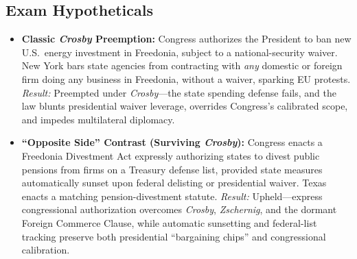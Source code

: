 \documentclass[12pt]{article}
\begin{document}
\subsection{Exam Hypotheticals}
\begin{itemize}
    \item \textbf{Classic \textit{Crosby} Preemption:} Congress authorizes the President to ban new U.S.\ energy investment in Freedonia, subject to a national-security waiver. New York bars state agencies from contracting with \textit{any} domestic or foreign firm doing any business in Freedonia, without a waiver, sparking EU protests. \textit{Result:} Preempted under \textit{Crosby}---the state spending defense fails, and the law blunts presidential waiver leverage, overrides Congress's calibrated scope, and impedes multilateral diplomacy.
    \item \textbf{``Opposite Side'' Contrast (Surviving \textit{Crosby}):} Congress enacts a Freedonia Divestment Act expressly authorizing states to divest public pensions from firms on a Treasury defense list, provided state measures automatically sunset upon federal delisting or presidential waiver. Texas enacts a matching pension-divestment statute. \textit{Result:} Upheld---express congressional authorization overcomes \textit{Crosby}, \textit{Zschernig}, and the dormant Foreign Commerce Clause, while automatic sunsetting and federal-list tracking preserve both presidential ``bargaining chips'' and congressional calibration.
\end{itemize}
\end{document}
